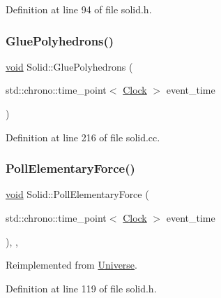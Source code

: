 Definition at line 94 of file solid.\+h.

\mbox{\label{class_solid_a94bb5df6d873c14a94355fc95557efd6}} 
\subsubsection{\texorpdfstring{Glue\+Polyhedrons()}{GluePolyhedrons()}}
{\footnotesize\ttfamily \mbox{\hyperlink{glad_8h_a950fc91edb4504f62f1c577bf4727c29}{void}} Solid\+::\+Glue\+Polyhedrons (\begin{DoxyParamCaption}\item[{std\+::chrono\+::time\+\_\+point$<$ \mbox{\hyperlink{universe_8h_a0ef8d951d1ca5ab3cfaf7ab4c7a6fd80}{Clock}} $>$}]{event\+\_\+time }\end{DoxyParamCaption})}



Definition at line 216 of file solid.\+cc.

\mbox{\label{class_solid_ae2a486e59f11f96a1a39756b3f3da53f}} 
\subsubsection{\texorpdfstring{Poll\+Elementary\+Force()}{PollElementaryForce()}}
{\footnotesize\ttfamily \mbox{\hyperlink{glad_8h_a950fc91edb4504f62f1c577bf4727c29}{void}} Solid\+::\+Poll\+Elementary\+Force (\begin{DoxyParamCaption}\item[{std\+::chrono\+::time\+\_\+point$<$ \mbox{\hyperlink{universe_8h_a0ef8d951d1ca5ab3cfaf7ab4c7a6fd80}{Clock}} $>$}]{event\+\_\+time }\end{DoxyParamCaption})\hspace{0.3cm}{\ttfamily [inline]}, {\ttfamily [final]}, {\ttfamily [virtual]}}



Reimplemented from \mbox{\hyperlink{class_universe_a0c485c504542409cbb5cfd8543c35b11}{Universe}}.



Definition at line 119 of file solid.\+h.

\mbox{\label{class_solid_a1233a3fe43abca7d2a0f83d724fd6640}} 

